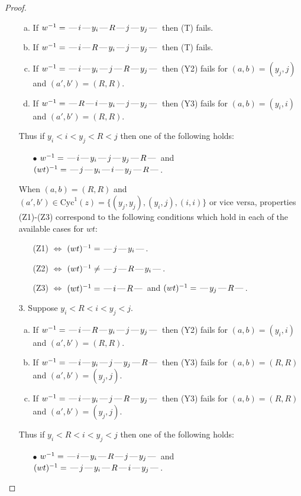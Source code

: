 \documentclass[10pt]{article}
\theoremstyle{definition}
\theoremstyle{definition}
\def\dash{\text{\hspace{0.5mm}---\hspace{0.5mm}}}
\def\Cyc{\mathrm{Cyc}}
\begin{document}
\begin{proof}
\begin{enumerate}
\begin{enumerate}[(a)]
\item If $w^{-1} = \dash i\dash y_i\dash R\dash j\dash y_j\dash $ then (T) fails.
\item If $w^{-1} = \dash i\dash R\dash y_i\dash j\dash y_j\dash $ then (T) fails.
\item If $w^{-1} = \dash i\dash y_i\dash j\dash R\dash y_j\dash $ then (Y2) fails for $(a,b)=(y_j,j)$ and $(a',b')=(R,R)$.
\item If $w^{-1} = \dash R\dash i\dash y_i\dash j\dash y_j\dash $ then (Y3) fails for $(a,b)=(y_i,i)$ and $(a',b')=(R,R)$.
\end{enumerate}
Thus if $y_i < i < y_j < R < j$ then one of the following holds:
\begin{enumerate}
\item[$\bullet$] $w^{-1} = \dash i\dash y_i\dash j\dash y_j\dash R\dash $ and $(wt)^{-1} = \dash j\dash y_i\dash i\dash y_j\dash R\dash $.
\end{enumerate}
When $(a,b)= (R,R)$ and $(a',b')\in \Cyc^1(z)=\{(y_j,y_j),(y_i,j),(i,i)\}$ or vice versa,
properties (Z1)-(Z3) correspond to the following conditions which
hold in each of the available cases for $wt$:
\begin{enumerate}
\item[](Z1) $\Leftrightarrow$ $(wt)^{-1} = \dash j \dash y_i \dash$.
\item[](Z2) $\Leftrightarrow$ $(wt)^{-1} \neq \dash j \dash R \dash y_i \dash$.
\item[](Z3) $\Leftrightarrow$ $(wt)^{-1} = \dash i \dash R \dash$  and $(wt)^{-1} = \dash y_j \dash R \dash$.
\end{enumerate}
\item[$3$.] Suppose $y_i < R < i < y_j < j$.
\begin{enumerate}[(a)]
\item If $w^{-1} = \dash i\dash R\dash y_i\dash j\dash y_j\dash $ then (Y2) fails for $(a,b)=(y_i,i)$ and $(a',b')=(R,R)$.
\item If $w^{-1} = \dash i\dash y_i\dash j\dash y_j\dash R\dash $ then (Y3) fails for $(a,b)=(R,R)$ and $(a',b')=(y_j,j)$.
\item If $w^{-1} = \dash i\dash y_i\dash j\dash R\dash y_j\dash $ then (Y3) fails for $(a,b)=(R,R)$ and $(a',b')=(y_j,j)$.
\end{enumerate}
Thus if $y_i < R < i < y_j < j$ then one of the following holds:
\begin{enumerate}
\item[$\bullet$] $w^{-1} = \dash i\dash y_i\dash R\dash j\dash y_j\dash $ and $(wt)^{-1} = \dash j\dash y_i\dash R\dash i\dash y_j\dash $.

\end{enumerate}
\end{enumerate}
\end{proof}
\end{document}
